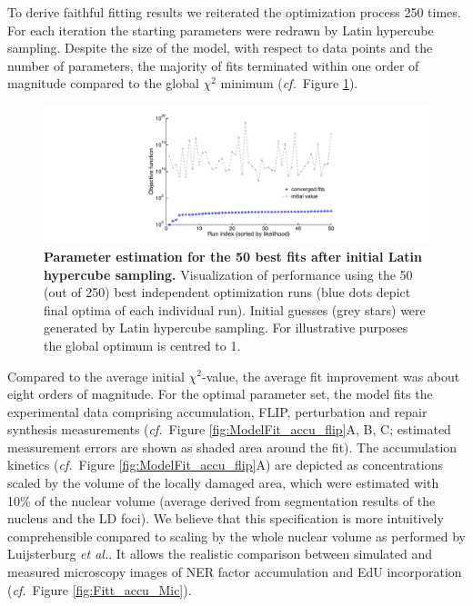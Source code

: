 To derive faithful fitting results we reiterated the optimization process 250 times. For each iteration the starting parameters were redrawn by Latin hypercube sampling. Despite the size of the model, with respect to data points and the number of parameters, the majority of fits terminated within one order of magnitude compared to the global $\chi^{2}$ minimum (\textit{cf.}\ Figure \ref{fig:LHS}).
\begin{figure}[t]
	\begin{center}
		\includegraphics[width=1\textwidth]{Abbildungen/figure2_6_4.pdf}
		\caption{\textbf{Parameter estimation for the 50 best fits after initial Latin hypercube sampling.} Visualization of performance using the 50 (out of 250) best independent optimization runs (blue dots depict final optima of each individual run). Initial guesses (grey stars) were generated by Latin hypercube sampling. For illustrative purposes the global optimum is centred to 1.}
		\label{fig:LHS}
	\end{center}
\end{figure} 

Compared to the average initial $\chi^{2}$-value, the average fit improvement was about eight orders of magnitude. For the optimal parameter set, the model fits the experimental data comprising accumulation, FLIP, perturbation and repair synthesis measurements (\textit{cf.}\ Figure \ref{fig:ModelFit_accu_flip}A, B, C; estimated measurement errors are shown as shaded area around the fit). The accumulation kinetics (\textit{cf.}\ Figure \ref{fig:ModelFit_accu_flip}A) are depicted as concentrations scaled by the volume of the locally damaged area, which were estimated with 10\% of the nuclear volume (average derived from segmentation results of the nucleus and the LD foci). We believe that this specification is more intuitively comprehensible  compared to scaling by the whole nuclear volume as performed by Luijsterburg \textit{et al.}\cite{Luijsterburg2010}. It allows the realistic comparison between simulated and measured microscopy images of NER factor accumulation and EdU incorporation (\textit{cf.}\ Figure \ref{fig:Fitt_accu_Mic}).  

